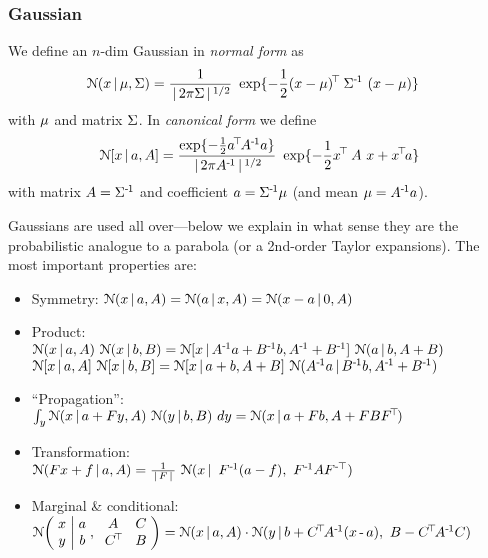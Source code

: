 \subsubsection{Gaussian}

\begin{myDefinition} We define an  $n$-dim Gaussian in \emph{normal
  form} as
\begin{align}
\NN(x \| \m, \S)
 &= \frac{1}{\|2\pi \S\|^{1/2}}~ \exp\{-\half (x-\m)^\T~ \S^\1~ (x-\m)\}
\end{align}
with  $\m$ and  matrix
$\S$. In \emph{canonical form} we define
\begin{align}
\NN[x \| a, A]
 = \frac{\exp\{-\half a^\T A^\1a\}}{\|2\pi A^\1\|^{1/2}}~
   \exp\{-\half x^\T~ A~ x + x^\T a\}
\end{align}
with  matrix $A = \S^\1$ and coefficient $a=\S^\1 \m$
(and mean $\m = A^\1 a$).
\end{myDefinition}

Gaussians are used all over---below we explain in what sense they are
the probabilistic analogue to a parabola (or a 2nd-order Taylor
expansions). The most important properties are:
\begin{itemize}
\providecommand{\+}{\myplus}
\renewcommand{\-}{\,\text{-}\,}

\item Symmetry: \qquad $\NN(x\|a,A) = \NN(a\|x,A) = \NN(x-a\|0,A)$
\item Product:\\
$\NN(x \| a,A)~ \NN(x \| b,B) 
 = \NN[x \| A^\1 a+B^\1 b, A^\1 + B^\1]~ \NN(a\|b,A+B)$\\
$\NN[x \| a,A]~ \NN[x \| b,B]
 = \NN[x \| a+b,A+B]~ \NN(A^\1 a \| B^\1 b, A^\1+B^\1)$
\item ``Propagation'':\\
$\int_y \NN(x \| a + Fy, A)~ \NN(y \| b, B)~ dy
 = \NN(x \| a + Fb, A+FBF^\T)$
\item Transformation:\\
$ \NN(F x + f \| a,A)
 = \frac{1}{\|F\|}~ \NN(x \| ~ F^\1 (a-f),~ F^\1 AF^\mT) $
\item Marginal \& conditional:\\
$\NN\bigg( \arr{c}{x\\ y} \bigg| \arr{c}{a\\ b} ,~ 
         \arr{cc}{A & C\\ C^\T & B} \bigg)
 = \NN(x \| a,A) \cdot \NN(y \| b+C^\T A^\1(x\-a),~ B - C^\T A^\1 C)$
\end{itemize}

